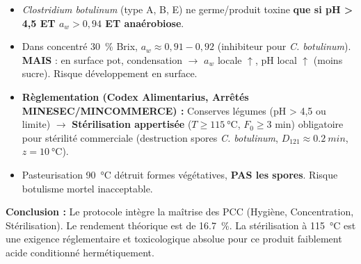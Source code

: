 \documentclass[11pt]{article}
\begin{document}
\begin{exoresolu}
\begin{enumerate}
\begin{itemize}
                \item \textit{Clostridium botulinum} (type A, B, E) ne germe/produit toxine \textbf{que si pH > 4,5 ET $a_w > 0,94$ ET anaérobiose}.
                \item Dans concentré \SI{30}{\%} Brix, $a_w \approx 0,91-0,92$ (inhibiteur pour \textit{C. botulinum}). \textbf{MAIS} : en surface pot, condensation $\rightarrow$ $a_w$ locale $\uparrow$, pH local $\uparrow$ (moins sucre). Risque développement en surface.
                \item \textbf{Règlementation (Codex Alimentarius, Arrêtés MINESEC/MINCOMMERCE) :} Conserves légumes (pH > 4,5 ou limite) $\rightarrow$ \textbf{Stérilisation appertisée} ($T \ge \SI{115}{\celsius}$, $F_0 \ge 3$ min) obligatoire pour stérilité commerciale (destruction spores \textit{C. botulinum}, $D_{121} \approx \SI{0,2}{min}$, $z = \SI{10}{\celsius}$).
                \item Pasteurisation \SI{90}{\celsius} détruit formes végétatives, \textbf{PAS les spores}. Risque botulisme mortel inacceptable.
            \end{itemize}
    \end{enumerate}
    \textbf{Conclusion :} Le protocole intègre la maîtrise des PCC (Hygiène, Concentration, Stérilisation). Le rendement théorique est de \SI{16,7}{\%}. La stérilisation à \SI{115}{\celsius} est une exigence réglementaire et toxicologique absolue pour ce produit faiblement acide conditionné hermétiquement.
\end{exoresolu}
\end{document}
